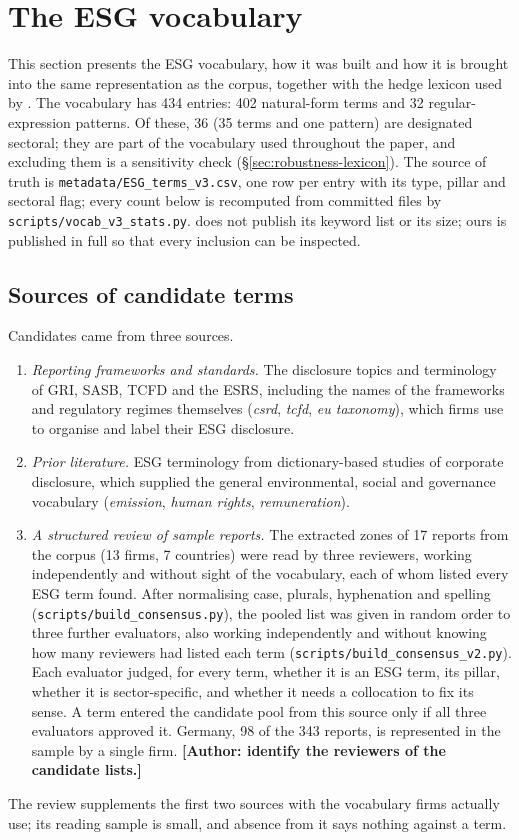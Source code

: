 \section{The ESG vocabulary}
\label{sec:lexicon}

This section presents the ESG vocabulary, how it was built and how it is
brought into the same representation as the corpus, together with the hedge
lexicon used by \HEDGE. The vocabulary has 434 entries: 402 natural-form terms
and 32 regular-expression patterns. Of these, 36 (35 terms and one pattern)
are designated sectoral; they are part of the vocabulary used throughout the
paper, and excluding them is a sensitivity check
(\S\ref{sec:robustness-lexicon}). The source of truth is
\nolinkurl{metadata/ESG_terms_v3.csv}, one row per entry with its type,
pillar and sectoral flag; every count below is recomputed from committed files
by \nolinkurl{scripts/vocab_v3_stats.py}. \citet{lagasio2024} does not publish
its keyword list or its size; ours is published in full so that every
inclusion can be inspected.

\subsection{Sources of candidate terms}
\label{sec:lexicon-sources}

Candidates came from three sources.
\begin{enumerate}
\item \emph{Reporting frameworks and standards.} The disclosure topics and
  terminology of GRI, SASB, TCFD and the ESRS, including the names of the
  frameworks and regulatory regimes themselves (\emph{csrd}, \emph{tcfd},
  \emph{eu taxonomy}), which firms use to organise and label their ESG
  disclosure.
\item \emph{Prior literature.} ESG terminology from dictionary-based studies of
  corporate disclosure, which supplied the general environmental, social and
  governance vocabulary (\emph{emission}, \emph{human rights},
  \emph{remuneration}).
\item \emph{A structured review of sample reports.} The extracted zones of 17
  reports from the corpus (13 firms, 7 countries) were read by three
  reviewers, working independently and without sight of the vocabulary, each
  of whom listed every ESG term found. After normalising case, plurals,
  hyphenation and spelling (\nolinkurl{scripts/build_consensus.py}), the pooled
  list was given in random order to three further evaluators, also working
  independently and without knowing how many reviewers had listed each term
  (\nolinkurl{scripts/build_consensus_v2.py}). Each evaluator judged, for every
  term, whether it is an ESG term, its pillar, whether it is sector-specific,
  and whether it needs a collocation to fix its sense. A term entered the
  candidate pool from this source only if all three evaluators approved it.
  Germany, 98 of the 343 reports, is represented in the sample by a single
  firm. \textbf{[Author: identify the reviewers of the candidate lists.]}
\end{enumerate}
The review supplements the first two sources with the vocabulary firms
actually use; its reading sample is small, and absence from it says nothing
against a term.

